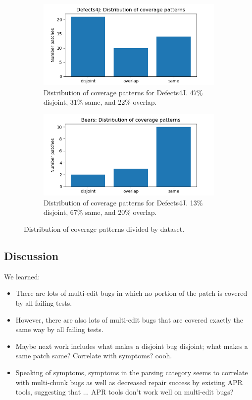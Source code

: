 \begin{figure}
	\begin{subfigure}{\linewidth}
		\includegraphics[width=\linewidth]{img/coverage-d4j.png}
		\caption{Distribution of coverage patterns for Defects4J. 47\% disjoint, 31\% same, and 22\% 
		overlap.}
	\end{subfigure}
	\begin{subfigure}{\linewidth}
		\includegraphics[width=\linewidth]{img/coverage-bears.png}
		\caption{Distribution of coverage patterns for Defects4J. 13\% disjoint, 67\% same, and 20\% 
		overlap.}
	\end{subfigure}
	\caption{Distribution of coverage patterns divided by dataset.}
	\label{fig:coverage-datasets}
\end{figure}




\subsection{Discussion}

We learned:
\begin{itemize}
	\item There are lots of multi-edit bugs in which no portion of the patch is covered by all failing 
	tests.
	\item However, there are also lots of multi-edit bugs that are covered exactly the same way by all 
	failing tests.
	\item Maybe next work includes what makes a disjoint bug disjoint; what makes a same patch 
	same? Correlate with symptoms? oooh.
	\item Speaking of symptoms, symptoms in the parsing category seems to correlate with 
	multi-chunk bugs as well as decreased repair success by existing APR tools, suggesting that ... 
	APR tools don't work well on multi-edit bugs?
\end{itemize}